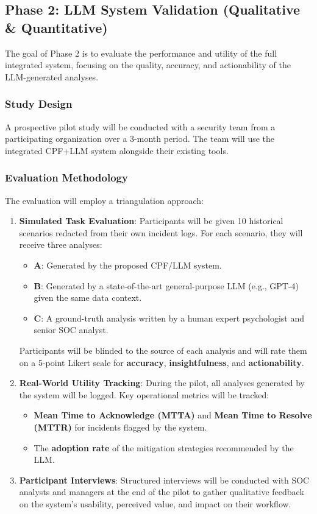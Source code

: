 \documentclass[11pt, a4paper]{article}
\begin{document}
\subsection{Phase 2: LLM System Validation (Qualitative \& Quantitative)}
The goal of Phase 2 is to evaluate the performance and utility of the full integrated system, focusing on the quality, accuracy, and actionability of the LLM-generated analyses.

\subsubsection{Study Design}
A prospective pilot study will be conducted with a security team from a participating organization over a 3-month period. The team will use the integrated CPF+LLM system alongside their existing tools.

\subsubsection{Evaluation Methodology}
The evaluation will employ a triangulation approach:
\begin{enumerate}
    \item \textbf{Simulated Task Evaluation}: Participants will be given 10 historical scenarios redacted from their own incident logs. For each scenario, they will receive three analyses:
    \begin{itemize}
        \item \textbf{A}: Generated by the proposed CPF/LLM system.
        \item \textbf{B}: Generated by a state-of-the-art general-purpose LLM (e.g., GPT-4) given the same data context.
        \item \textbf{C}: A ground-truth analysis written by a human expert psychologist and senior SOC analyst.
    \end{itemize}
    Participants will be blinded to the source of each analysis and will rate them on a 5-point Likert scale for \textbf{accuracy}, \textbf{insightfulness}, and \textbf{actionability}.
    \item \textbf{Real-World Utility Tracking}: During the pilot, all analyses generated by the system will be logged. Key operational metrics will be tracked:
    \begin{itemize}
        \item \textbf{Mean Time to Acknowledge (MTTA)} and \textbf{Mean Time to Resolve (MTTR)} for incidents flagged by the system.
        \item The \textbf{adoption rate} of the mitigation strategies recommended by the LLM.
    \end{itemize}
    \item \textbf{Participant Interviews}: Structured interviews will be conducted with SOC analysts and managers at the end of the pilot to gather qualitative feedback on the system's usability, perceived value, and impact on their workflow.
\end{enumerate}
\end{document}
